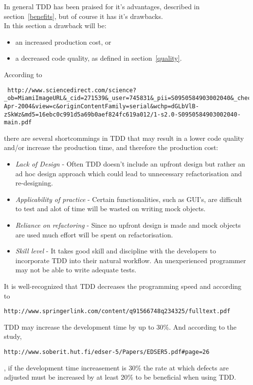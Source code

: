 In general TDD has been praised for it's advantages, described in section~\ref{benefits}, but of course it has it's drawbacks.\\

\noindent In this section a drawback will be:
\begin{itemize}
\item an increased production cost, or
\item a decreased code quality, as defined in section~\ref{quality}.
\end{itemize}

According to \begin{verbatim} http://www.sciencedirect.com/science?_ob=MiamiImageURL&_cid=271539&_user=745831&_pii=S0950584903002040&_check=y&_origin=article&_zone=toolbar&_coverDate=15-Apr-2004&view=c&originContentFamily=serial&wchp=dGLbVlB-zSkWz&md5=16ebc0c991d5a69b0aef824fc619a012/1-s2.0-S0950584903002040-main.pdf\end{verbatim} there are several shortcommings in TDD that may result in a lower code quality and/or increase the production time, and therefore the production cost:
\begin{itemize}
 \item \textit{Lack of Design} - Often TDD doesn't include an upfront design but rather an ad hoc design approach which could lead to unnecessary refactorisation and re-designing. 
 \item \textit{Applicability of practice} - Certain functionalities, such as GUI's, are difficult to test and alot of time will be wasted on writing mock objects.
 \item \textit{Reliance on refactoring} - Since no upfront design is made and mock objects are used much effort will be spent on refactorisation.
 \item \textit{Skill level} - It takes good skill and discipline with the developers to incorporate TDD into their natural workflow. An unexperienced programmer may not be able to write adequate tests.\\
\end{itemize}

\noindent It is well-recognized that TDD decreases the programming speed and according to \begin{verbatim}http://www.springerlink.com/content/q91566748q234325/fulltext.pdf\end{verbatim} TDD may increase the development time by up to 30\%. 
And according to the study, \begin{verbatim}http://www.soberit.hut.fi/edser-5/Papers/EDSER5.pdf#page=26\end{verbatim}, if the development time increasement is 30\% the rate at which defects are adjusted must be increased by at least 20\% to be beneficial when using TDD.
